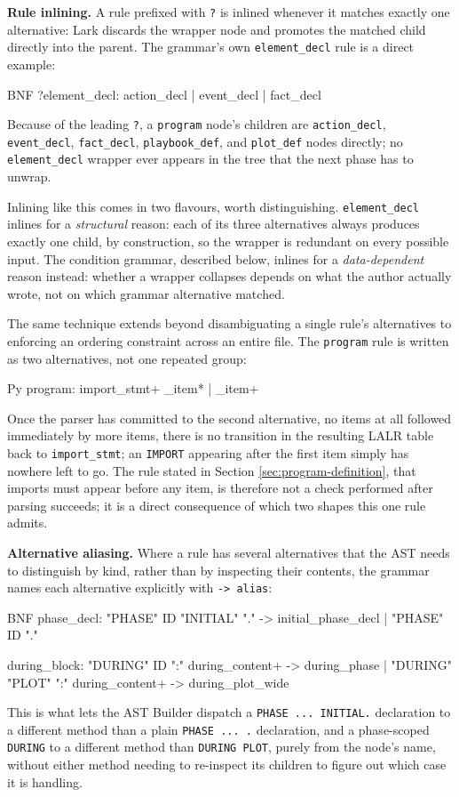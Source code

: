 \textbf{Rule inlining.} A rule prefixed with \lstinline|?| is inlined whenever it matches exactly one alternative: Lark discards the wrapper node and promotes the matched child directly into the parent. The grammar's own \lstinline|element_decl| rule is a direct example:
\begin{codeblock}[]{BNF}
?element_decl: action_decl
    | event_decl
    | fact_decl
\end{codeblock}
Because of the leading \lstinline|?|, a \lstinline|program| node's children are \lstinline|action_decl|, \lstinline|event_decl|, \lstinline|fact_decl|, \lstinline|playbook_def|, and \lstinline|plot_def| nodes directly; no \lstinline|element_decl| wrapper ever appears in the tree that the next phase has to unwrap.

Inlining like this comes in two flavours, worth distinguishing. \lstinline|element_decl| inlines for a \emph{structural} reason: each of its three alternatives always produces exactly one child, by construction, so the wrapper is redundant on every possible input. The condition grammar, described below, inlines for a \emph{data-dependent} reason instead: whether a wrapper collapses depends on what the author actually wrote, not on which grammar alternative matched.

The same technique extends beyond disambiguating a single rule's alternatives to enforcing an ordering constraint across an entire file. The \lstinline|program| rule is written as two alternatives, not one repeated group:
\begin{codeblock}[]{Py}
program: import_stmt+ _item* | _item+
\end{codeblock}

Once the parser has committed to the second alternative, no items at all followed immediately by more items, there is no transition in the resulting LALR table back to \lstinline|import_stmt|; an \lstinline|IMPORT| appearing after the first item simply has nowhere left to go. The rule stated in Section \ref{sec:program-definition}, that imports must appear before any item, is therefore not a check performed after parsing succeeds; it is a direct consequence of which two shapes this one rule admits.

\textbf{Alternative aliasing.} Where a rule has several alternatives that the AST needs to distinguish by kind, rather than by inspecting their contents, the grammar names each alternative explicitly with \lstinline|-> alias|:
\begin{codeblock}[]{BNF}
phase_decl: "PHASE" ID "INITIAL" "." -> initial_phase_decl
    | "PHASE" ID "."

during_block: "DURING" ID ":" during_content+ -> during_phase
    | "DURING" "PLOT" ":" during_content+ -> during_plot_wide
\end{codeblock}
This is what lets the AST Builder dispatch a \lstinline|PHASE ... INITIAL.| declaration to a different method than a plain \lstinline|PHASE ... .| declaration, and a phase-scoped \lstinline|DURING| to a different method than \lstinline|DURING PLOT|, purely from the node's name, without either method needing to re-inspect its children to figure out which case it is handling.

